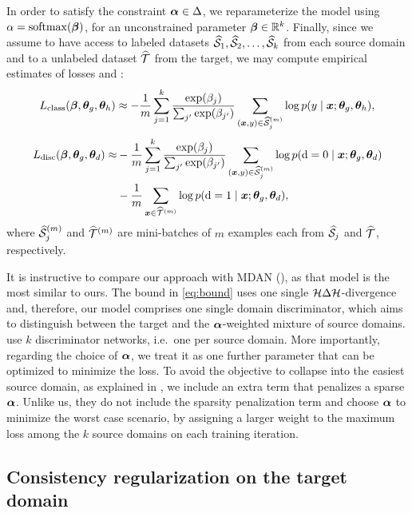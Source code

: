 In order to satisfy the constraint ${\bm{\alpha}} \in \Delta$, we reparameterize the model using $\alpha = \mathrm{softmax}({\bm{\beta}})$, for an unconstrained parameter ${\bm{\beta}} \in {\mathbb{R}}^k$. Finally, since we assume to have access to labeled datasets $\widehat{{\mathcal{S}}}_1,\widehat{{\mathcal{S}}}_2,\dots,\widehat{{\mathcal{S}}}_k$ from each source domain and to a unlabeled dataset $\widehat{{\mathcal{T}}}$ from the target, we may compute empirical estimates of losses  and :
\begin{equation}
\label{eq:emp_loss_class}
L_\text{class}({\bm{\beta}}, {\bm{\theta}}_g, {\bm{\theta}}_h) \approx -\frac{1}{m}\sum_{j=1}^k \frac{\exp({\beta}_j)}{\sum_{j'} \exp({\beta}_{j'})} \sum_{({\bm{x}},y) \in \widehat{{\mathcal{S}}}_j^{(m)}} \log p(y \mid {\bm{x}}; {\bm{\theta}}_g, {\bm{\theta}}_h),
\end{equation}
\begin{align}
\label{eq:emp_loss_disc}
L_\text{disc}({\bm{\beta}}, {\bm{\theta}}_g, {\bm{\theta}}_d) \approx& -\frac{1}{m}\sum_{j=1}^k \frac{\exp({\beta}_j)}{\sum_{j'} \exp({\beta}_{j'})} \sum_{({\bm{x}},y) \in \widehat{{\mathcal{S}}}_j^{(m)}} \log p({\textnormal{d}}=0 \mid {\bm{x}}; {\bm{\theta}}_g, {\bm{\theta}}_d) \\
&-\frac{1}{m}\sum_{{\bm{x}} \in \widehat{{\mathcal{T}}}^{(m)}} \log p({\textnormal{d}}=1 \mid {\bm{x}}; {\bm{\theta}}_g, {\bm{\theta}}_d), \nonumber
\end{align}
where $\widehat{{\mathcal{S}}}_j^{(m)}$ and $\widehat{{\mathcal{T}}}^{(m)}$ are mini-batches of $m$ examples each from $\widehat{{\mathcal{S}}}_j$ and $\widehat{{\mathcal{T}}}$, respectively.

It is instructive to compare our approach with MDAN (\citet{Zhao2018}), as that model is the most similar to ours. The bound in \eqref{eq:bound} uses one single ${\mathcal{H}} \Delta {\mathcal{H}}$-divergence and, therefore, our model comprises one single domain discriminator, which aims to distinguish between the target and the ${\bm{\alpha}}$-weighted mixture of source domains. \citet{Zhao2018} use $k$ discriminator networks, i.e.\ one per source domain. More importantly, regarding the choice of ${\bm{\alpha}}$, we treat it as one further parameter that can be optimized to minimize the loss. To avoid the objective to collapse into the easiest source domain, as explained in , we include an extra term that penalizes a sparse ${\bm{\alpha}}$. Unlike us, they do not include the sparsity penalization term and choose ${\bm{\alpha}}$ to minimize the worst case scenario, by assigning a larger weight to the maximum loss among the $k$ source domains on each training iteration.

\subsection{Consistency regularization on the target domain}
\label{sec:modafm_consistency}

